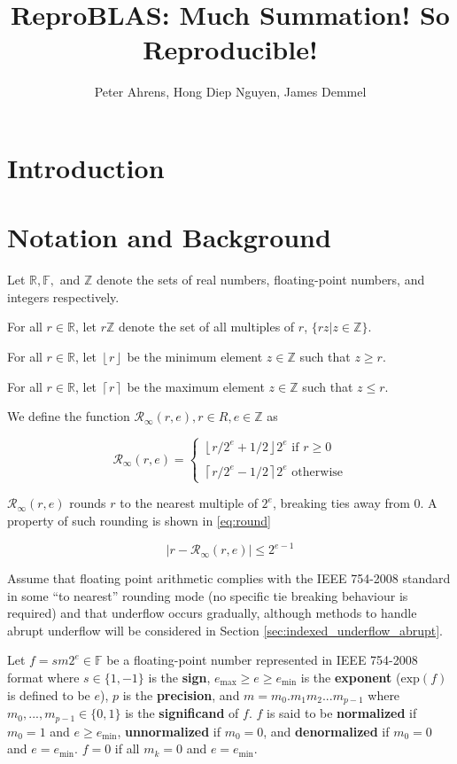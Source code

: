\documentclass[12pt]{article}
\author{Peter Ahrens, Hong Diep Nguyen, James Demmel}
\title{ReproBLAS: Much Summation! So Reproducible!}
\providecommand{\ceil}[1]{\left \lceil #1 \right \rceil }
\providecommand{\floor}[1]{\left \lfloor #1 \right \rfloor }
\providecommand{\R}{\ensuremath{\mathbb{R}}}
\providecommand{\F}{\ensuremath{\mathbb{F}}}
\providecommand{\Z}{\ensuremath{\mathbb{Z}}}
\providecommand{\exp}{\ensuremath{\text{exp}}}
\providecommand{\min}{\ensuremath{\text{min}}}
\providecommand{\max}{\ensuremath{\text{max}}}
\providecommand{\roundtonearestinfty}{\ensuremath{\mathcal{R}_\text{$\infty$}}}
\theoremstyle{definition}
\numberwithin{equation}{section}
\numberwithin{figure}{section}
\begin{document}
\noindent
\maketitle
\tableofcontents
\newpage
\section{Introduction}
\section{Notation and Background}
  Let $\R, \F, $ and $\Z$ denote the sets of real numbers, floating-point numbers, and integers respectively.

  For all $r \in \R$, let $r\Z$ denote the set of all multiples of $r$, $\{rz | z \in \Z\}$.

  For all $r \in \R$, let $\floor{r}$ be the minimum element $z \in \Z$ such that $z \geq r$.

  For all $r \in \R$, let $\ceil{r}$ be the maximum element $z \in \Z$ such that $z \leq r$.

  We define the function $\roundtonearestinfty(r, e), r \in R, e \in \Z$ as

  \begin{equation}
    \roundtonearestinfty(r, e) = \begin{cases}\floor{r/2^e + 1/2} 2^e \text{ if } r \geq 0\\ \\ \ceil{r/2^e - 1/2} 2^e \text{ otherwise}\end{cases}
  \end{equation}

  $\roundtonearestinfty(r, e)$ rounds $r$ to the nearest multiple of $2^e$, breaking ties away from 0. A property of such rounding is shown in  \eqref{eq:round}

  \begin{equation}
    |r - \roundtonearestinfty(r, e)| \leq 2^{e - 1}
    \label{eq:round}
  \end{equation}

  Assume that floating point arithmetic complies with the IEEE 754-2008 standard \cite{ieee754} in some ``to nearest'' rounding mode (no specific tie breaking behaviour is required) and that underflow occurs gradually, although methods to handle abrupt underflow will be considered in Section \ref{sec:indexed_underflow_abrupt}.

  Let $f = sm2^e \in \F$ be a floating-point number represented in IEEE 754-2008 format \cite{ieee754} where $s \in \{1, -1\}$ is the \textbf{sign}, $e_{\max} \geq e \geq e_{\min}$ is the \textbf{exponent} ($\exp(f)$ is defined to be $e$), $p$ is the \textbf{precision}, and $m = m_0.m_1m_2...m_{p-1}$ where $m_0, ..., m_{p - 1} \in \{0, 1\}$ is the \textbf{significand} of $f$. $f$ is said to be \textbf{normalized} if $m_0 = 1$ and $e \geq e_{\min}$, \textbf{unnormalized} if $m_0 = 0$, and \textbf{denormalized} if $m_0 = 0$ and $e = e_{\min}$. $f = 0$ if all $m_k = 0$ and $e = e_{\min}$.
\end{document}
